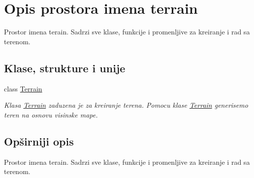 \hypertarget{namespaceterrain}{}\section{Opis prostora imena terrain}
\label{namespaceterrain}


Prostor imena terain. Sadrzi sve klase, funkcije i promenljive za kreiranje i rad sa terenom.  


\subsection*{Klase, strukture i unije}
\begin{DoxyCompactItemize}
\item 
class \hyperlink{classterrain_1_1Terrain}{Terrain}
\begin{DoxyCompactList}\small\item\em Klasa \hyperlink{classterrain_1_1Terrain}{Terrain} zaduzena je za kreiranje terena. Pomocu klase \hyperlink{classterrain_1_1Terrain}{Terrain} generisemo teren na osnovu visinske mape. \end{DoxyCompactList}\end{DoxyCompactItemize}


\subsection{Opširniji opis}
Prostor imena terain. Sadrzi sve klase, funkcije i promenljive za kreiranje i rad sa terenom. 